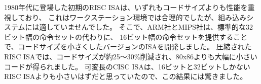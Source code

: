 \begin{commentary}
\begin{comment}
The initial RISC ISAs from the 1980s all picked performance over code
size, which was reasonable for a workstation environment, but not for
embedded systems. Hence, both ARM and MIPS subsequently made versions
of the ISAs that offered smaller code size by offering an alternative
16-bit wide instruction set instead of the standard 32-bit wide
instructions.  The compressed RISC ISAs reduced code size relative to
their starting points by about 25--30\%, yielding code that was
significantly \emph{smaller} than 80x86.  This result surprised some,
as their intuition was that the variable-length CISC ISA should be
smaller than RISC ISAs that offered only 16-bit and 32-bit formats.
\end{comment}

1980年代に登場した初期のRISC ISAは、いずれもコードサイズよりも性能を重視しており、
これはワークステーション環境では合理的でしたが、組み込みシステムには適していませんでした。
そこで、ARM社とMIPS社は、標準的な32ビット幅の命令セットの代わりに、
16ビット幅の命令セットを提供することで、コードサイズを小さくしたバージョンのISAを開発しました。
圧縮されたRISC ISAでは、コードサイズが約25～30\%削減され、80x86よりも大幅に小さいコードが得られました。
可変長のCISC ISAは、16ビットと32ビットしかないRISC ISAよりも小さいはずだと思っていたので、この結果には驚きました。

\begin{comment}
Since the original RISC ISAs did not leave sufficient opcode space
free to include these unplanned compressed instructions, they were
instead developed as complete new ISAs.  This meant compilers needed
different code generators for the separate compressed ISAs.  The first
compressed RISC ISA extensions (e.g., ARM Thumb and MIPS16) used only
a fixed 16-bit instruction size, which gave good reductions in static
code size but caused an increase in dynamic instruction count, which
led to lower performance compared to the original fixed-width 32-bit
instruction size.  This led to the development of a second generation
of compressed RISC ISA designs with mixed 16-bit and 32-bit
instruction lengths (e.g., ARM Thumb2, microMIPS, PowerPC VLE), so
that performance was similar to pure 32-bit instructions but with
significant code size savings.  Unfortunately, these different
generations of compressed ISAs are incompatible with each other and
with the original uncompressed ISA, leading to significant complexity
in documentation, implementations, and software tools support.
\end{comment}


\end{commentary}
